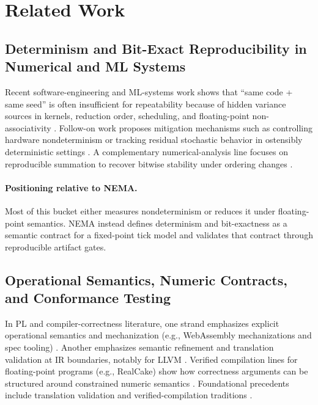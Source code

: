 \section{Related Work}

\subsection{Determinism and Bit-Exact Reproducibility in Numerical and ML Systems}

Recent software-engineering and ML-systems work shows that ``same code + same seed'' is often insufficient for repeatability because of hidden variance sources in kernels, reduction order, scheduling, and floating-point non-associativity \cite{PhamASE2020Variance,ChenICSE2022ReproDL,ZhuangArxiv2106.11872,ShanmugaveluArxiv2408.05148}. Follow-on work proposes mitigation mechanisms such as controlling hardware nondeterminism or tracking residual stochastic behavior in ostensibly deterministic settings \cite{SrivastavaArxiv2403.09603,AtilArxiv2408.04667,RaviArxiv2505.03165}. A complementary numerical-analysis line focuses on reproducible summation to recover bitwise stability under ordering changes \cite{AhrensTOMS2020ReproSum,BlanchardSIAM2020FABsum,ChouMICRO2020DAB}.

\paragraph{Positioning relative to NEMA.}
Most of this bucket either measures nondeterminism or reduces it under floating-point semantics. NEMA instead defines determinism and bit-exactness as a semantic contract for a fixed-point tick model and validates that contract through reproducible artifact gates.

\subsection{Operational Semantics, Numeric Contracts, and Conformance Testing}

In PL and compiler-correctness literature, one strand emphasizes explicit operational semantics and mechanization (e.g., WebAssembly mechanizations and spec tooling) \cite{WattFM2021WasmCert,YounPLDI2024SpecTec,RaoPOPL2025Progressful}. Another emphasizes semantic refinement and translation validation at IR boundaries, notably for LLVM \cite{LopesPLDI2021Alive2}. Verified compilation lines for floating-point programs (e.g., RealCake) show how correctness arguments can be structured around constrained numeric semantics \cite{BeckerECOOP2022RealCake}. Foundational precedents include translation validation and verified-compilation traditions \cite{PnueliTACAS1998TranslationValidation,LeroyCACM2009CompCert,YangPLDI2011Csmith}.

